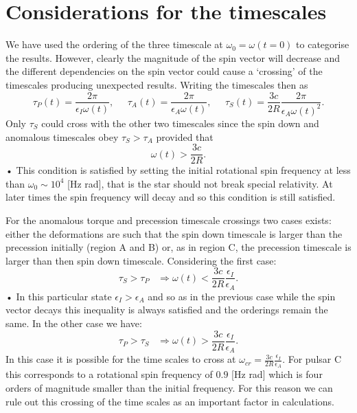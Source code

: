 \section{Considerations for the timescales}\label{sec: timescales}
We have used the ordering of the three timescale at $\omega_{0}=\omega(t=0)$
to categorise the results. However, clearly the magnitude of the spin vector
will decrease and the different dependencies on the spin vector could cause a
`crossing' of the timescales producing unexpected results. Writing the
timescales then as 
\begin{equation}
\tau_{P}(t)=\frac{2\pi}{\epsilon_{I}\omega(t)}, \;\;\;\;\; 
\tau_{A}(t)=\frac{2\pi}{\epsilon_{A}\omega(t)},  \;\;\;\;\; 
\tau_{S}(t)=\frac{3c}{2R}\frac{2\pi}{\epsilon_{A}\omega(t)^{2}}.
\end{equation}
Only $\tau_{S}$ could cross with the other two timescales since the spin down
and anomalous timescales obey $\tau_{S}>\tau_{A}$ provided that 
\begin{equation*}
\omega(t)>\frac{3c}{2R}.
\end{equation*}•
This condition is satisfied by setting the initial rotational spin frequency at
less than $\omega_{0} \sim 10^{4}$ [Hz rad], that is the star should not break
special relativity. At later times the spin frequency will decay and so this
condition is still satisfied.

For the anomalous torque and precession timescale crossings two cases exists:
either the deformations are such that the spin down timescale is larger than
the precession initially (region A and B) or, as in region C, the precession
timescale is larger than then spin down timescale. Considering the first case:
\begin{equation}
\tau_{S}>\tau_{P} \;\;\; 
\Rightarrow \omega(t)<\frac{3c}{2R}\frac{\epsilon_{I}}{\epsilon_{A}}.
\end{equation}•
In this particular state $\epsilon_{I}>\epsilon_{A}$ and so as in the previous
case while the spin vector decays this inequality is always satisfied and the
orderings remain the same. In the other case we have:
\begin{equation}
\tau_{P}>\tau_{S} \;\;\; 
\Rightarrow \omega(t)>\frac{3c}{2R}\frac{\epsilon_{I}}{\epsilon_{A}}.
\end{equation}
In this case it is possible for the time scales to cross at
$\omega_{cr}=\frac{3c}{2R}\frac{\epsilon_{I}}{\epsilon_{A}}$. For pulsar C this
corresponds to a rotational spin frequency of $0.9$ [Hz rad] which is four
orders of magnitude smaller than the initial frequency. For this reason we can
rule out this crossing of the time scales as an important factor in
calculations. 


